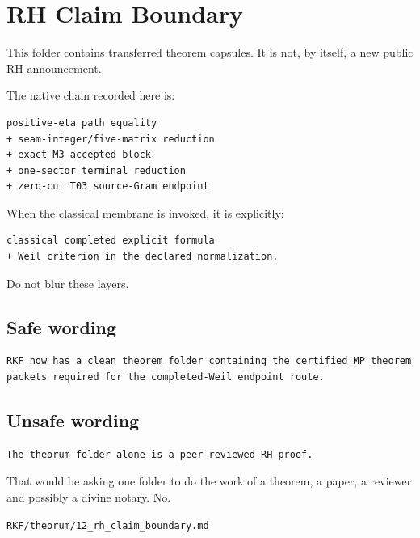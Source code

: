 \hypertarget{rh-claim-boundary}{%
\chapter{RH Claim Boundary}\label{rh-claim-boundary}}

This folder contains transferred theorem capsules. It is not, by itself, a new public RH announcement.

The native chain recorded here is:

\begin{verbatim}
positive-eta path equality
+ seam-integer/five-matrix reduction
+ exact M3 accepted block
+ one-sector terminal reduction
+ zero-cut T03 source-Gram endpoint
\end{verbatim}

When the classical membrane is invoked, it is explicitly:

\begin{verbatim}
classical completed explicit formula
+ Weil criterion in the declared normalization.
\end{verbatim}

Do not blur these layers.

\hypertarget{safe-wording}{%
\section{Safe wording}\label{safe-wording}}

\begin{verbatim}
RKF now has a clean theorem folder containing the certified MP theorem packets required for the completed-Weil endpoint route.
\end{verbatim}

\hypertarget{unsafe-wording}{%
\section{Unsafe wording}\label{unsafe-wording}}

\begin{verbatim}
The theorum folder alone is a peer-reviewed RH proof.
\end{verbatim}

That would be asking one folder to do the work of a theorem, a paper, a reviewer and possibly a divine notary. No.

\begin{flushright}\small\texttt{RKF/theorum/12\_rh\_claim\_boundary.md}\end{flushright}

